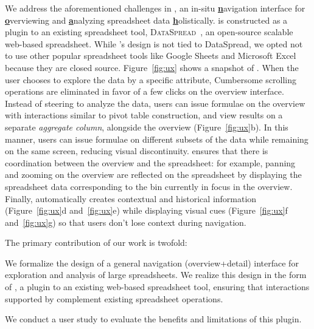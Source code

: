  We address the aforementioned challenges
in \noah,
an in-situ
\textbf{\underline{n}}avigation interface
for \textbf{\underline{o}}verviewing
and \textbf{\underline{a}}nalyzing
spreadsheet data \textbf{\underline{h}}olistically.
\noah is constructed as a plugin to
an existing spreadsheet tool,
{\scshape DataSpread}~\cite{dataspread},
an open-source scalable web-based spreadsheet.
While \noah's design is not tied to {\sc DataSpread},
we opted not to use other popular spreadsheet
tools like Google Sheets and Microsoft Excel because they
are closed source.
Figure~\ref{fig:ux} shows a snapshot of \noah.
When the user chooses to explore
the data by a specific attribute,
Cumbersome scrolling operations are eliminated in favor
of a few clicks on the overview interface. Instead of steering to analyze the data,
users can issue formulae
on the overview with interactions similar to pivot table construction,
and view results on a separate {\em aggregate column},
alongside the overview (Figure~\ref{fig:ux}b). 
In this manner,
users can issue formulae on different
subsets of the data while remaining on the same screen,
reducing visual discontinuity.
\noah ensures that there is coordination between
the overview and the spreadsheet:
for example, panning and zooming on the overview
are reflected on the spreadsheet by displaying
the spreadsheet data corresponding to the bin
currently in focus in the overview.
Finally, \noah automatically creates
contextual and historical information
(Figure~\ref{fig:ux}d and~\ref{fig:ux}e)
while displaying visual cues
(Figure~\ref{fig:ux}f and~\ref{fig:ux}g)
so that users don't lose context during navigation.

The primary contribution of our work is twofold:
\squishlist
\item We formalize the design of a general
navigation (overview+detail) interface
for exploration and analysis of large spreadsheets.
We realize this design in the form of \noah,
a plugin to an existing web-based spreadsheet tool,
ensuring that interactions supported by \noah
complement existing spreadsheet operations.
\item We conduct a user study to evaluate
the benefits and limitations of this plugin.
 
\squishend


